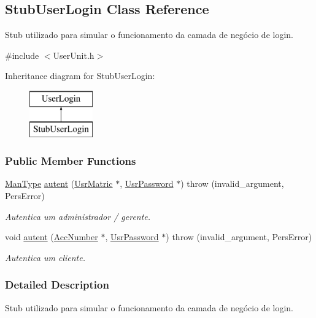 \hypertarget{classStubUserLogin}{\subsection{Stub\-User\-Login Class Reference}
\label{d1/dbd/classStubUserLogin}
}


Stub utilizado para simular o funcionamento da camada de negócio de login.  




{\ttfamily \#include $<$User\-Unit.\-h$>$}

Inheritance diagram for Stub\-User\-Login\-:\begin{figure}[H]
\begin{center}
\leavevmode
\includegraphics[height=2.000000cm]{d1/dbd/classStubUserLogin}
\end{center}
\end{figure}
\subsubsection*{Public Member Functions}
\begin{DoxyCompactItemize}
\item 
\hyperlink{classUsrType}{Man\-Type} \hyperlink{classStubUserLogin_a9d84171d20e4e5dd9efb24cec9e61928}{autent} (\hyperlink{classUsrMatric}{Usr\-Matric} $\ast$, \hyperlink{classUsrPassword}{Usr\-Password} $\ast$)  throw (invalid\-\_\-argument, Pers\-Error)
\begin{DoxyCompactList}\small\item\em Autentica um administrador / gerente. \end{DoxyCompactList}\item 
void \hyperlink{classStubUserLogin_a27bea5e442f63d62863ea4db5553d5cd}{autent} (\hyperlink{classAccNumber}{Acc\-Number} $\ast$, \hyperlink{classUsrPassword}{Usr\-Password} $\ast$)  throw (invalid\-\_\-argument, Pers\-Error)
\begin{DoxyCompactList}\small\item\em Autentica um cliente. \end{DoxyCompactList}\end{DoxyCompactItemize}


\subsubsection{Detailed Description}
Stub utilizado para simular o funcionamento da camada de negócio de login. 

